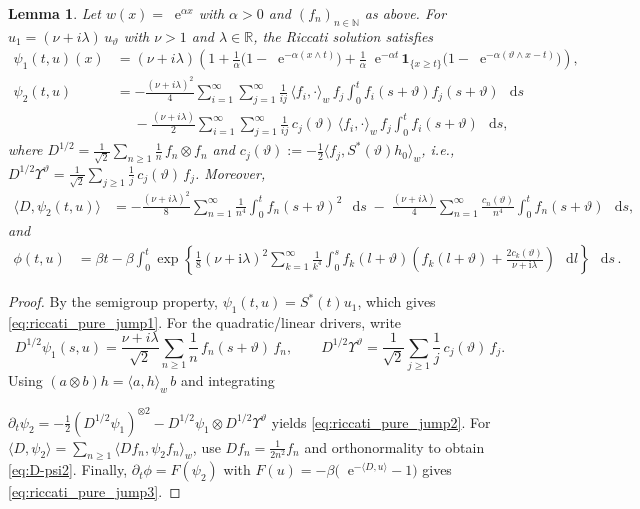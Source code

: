 \documentclass[10pt,a4paper,reqno]{amsart}
\newcommand*\D{\mathop{}\!\mathrm{d}}
\newcommand*\E{\mathop{}\!\mathrm{e}}
\numberwithin{equation}{section}
\newtheorem{lemma}[theorem]{Lemma}
\theoremstyle{plain}
\theoremstyle{definition}
\theoremstyle{example}
\renewcommand{\MR}{\mathbb{R}}
\newcommand{\MN}{\mathbb{N}}
\newcommand{\R}{\MR}
\newcommand{\N}{\MN}
\begin{document}
\begin{lemma}\label{lem:Riccati-pure-jump-stoc-vol}
Let $w(x)=\E^{\alpha x}$ with $\alpha>0$ and $(f_n)_{n\in\N}$ as above. For $u_1=(\nu+i\lambda)\,u_\vartheta$ with $\nu>1$ and $\lambda\in\R$, the Riccati solution satisfies
\begin{align}
  \psi_1(t,u)(x) 
  &= (\nu+i\lambda)\!\left(1+\frac{1}{\alpha}\big(1-\E^{-\alpha(x\wedge t)}\big)
                                +\frac{1}{\alpha}\E^{-\alpha t}\,\mathbf 1_{\{x\ge t\}}
                                   \big(1-\E^{-\alpha(\vartheta\wedge x-t)}\big)\right),
  \label{eq:riccati_pure_jump1}\\[4pt]
  \psi_2(t,u)
  &= -\frac{(\nu+i\lambda)^2}{4}
     \sum_{i=1}^{\infty}\sum_{j=1}^{\infty}\frac{1}{ij}\,
     \langle f_i,\cdot\rangle_w\, f_j \int_0^t f_i(s+\vartheta)f_j(s+\vartheta)\,\D s
     \nonumber\\[-2pt]
  &\quad\; -\frac{(\nu+i\lambda)}{2}
     \sum_{i=1}^{\infty}\sum_{j=1}^{\infty}\frac{1}{ij}\,c_j(\vartheta)\,
     \langle f_i,\cdot\rangle_w\, f_j \int_0^t f_i(s+\vartheta)\,\D s,
  \label{eq:riccati_pure_jump2}
\end{align}
where 
$D^{1/2}=\tfrac{1}{\sqrt2}\sum_{n\ge1}\frac{1}{n}\,f_n\otimes f_n$
and $c_j(\vartheta):=-\tfrac12\langle f_j,S^*(\vartheta)h_0\rangle_w$, i.e., $D^{1/2}\Upsilon^\vartheta=\tfrac{1}{\sqrt2}\sum_{j\ge1}\frac{1}{j}\,c_j(\vartheta)\,f_j$.
Moreover,
\begin{align}
  \langle D,\psi_2(t,u)\rangle
  &= -\frac{(\nu+i\lambda)^2}{8}\sum_{n=1}^{\infty}\frac{1}{n^4}\int_0^t f_n(s+\vartheta)^2\,\D s
     \;-\;\frac{(\nu+i\lambda)}{4}\sum_{n=1}^{\infty}\frac{c_n(\vartheta)}{n^4}\int_0^t f_n(s+\vartheta)\,\D s,
  \label{eq:D-psi2}
\end{align}
and 
\begin{align}
    \phi(t, u) &= \beta t - \beta \int_0^t \exp\left\{\frac{1}{8} (\nu+\mathrm{i}\lambda)^2\sum_{k=1}^\infty\frac{1}{k^4}\int_0^s f_k(l+\vartheta)\left(f_k(l+\vartheta)+\frac{2c_k(\vartheta)}{\nu+\mathrm{i}\lambda}\right)\, \D l\right\}\, \D s \label{eq:riccati_pure_jump3} \, . 
\end{align}
\end{lemma}
\begin{proof}
By the semigroup property, $\psi_1(t,u)=S^*(t)u_1$, which gives \eqref{eq:riccati_pure_jump1}. 
For the quadratic/linear drivers, write
$$
  D^{1/2}\psi_1(s,u)=\frac{\nu+i\lambda}{\sqrt2}\sum_{n\geq 1}\frac{1}{n}\,f_n(s+\vartheta)\,f_n,
  \qquad
  D^{1/2}\Upsilon^\vartheta=\frac{1}{\sqrt2}\sum_{j\geq 1}\frac{1}{j}\,c_j(\vartheta)\,f_j.
$$
Using $(a\otimes b)h=\langle a,h\rangle_w\,b$ and integrating 

$\partial_t\psi_2
= -\tfrac12(D^{1/2}\psi_1)^{\otimes2}-D^{1/2}\psi_1\otimes D^{1/2}\Upsilon^\vartheta$
yields \eqref{eq:riccati_pure_jump2}. 
For $\langle D,\psi_2\rangle=\sum_{n\geq 1 }\langle Df_n,\psi_2 f_n\rangle_w$, use
$Df_n=\tfrac{1}{2n^2}f_n$ and orthonormality to obtain \eqref{eq:D-psi2}. 
Finally, $\partial_t\phi=F(\psi_2)$ with 
$F(u)=-\beta\big(\E^{-\langle D,u\rangle}-1\big)$ gives \eqref{eq:riccati_pure_jump3}.
\end{proof}
\end{document}
